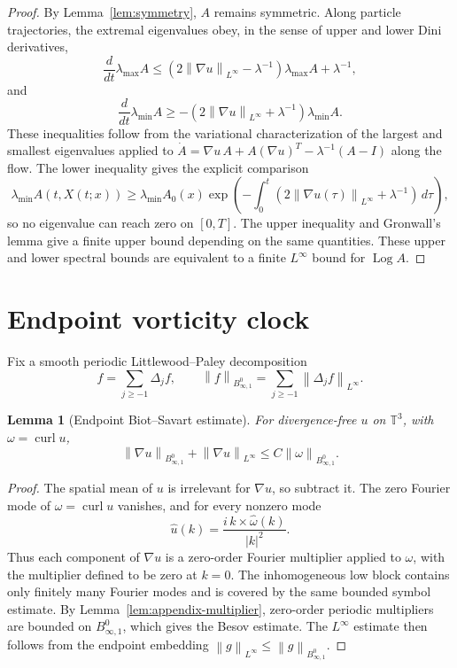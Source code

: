 \documentclass[10pt,a4paper]{amsart}
\numberwithin{equation}{section}
\newtheorem{lemma}[theorem]{Lemma}
\newcommand{\T}{\mathbb T}
\newcommand{\Id}{I}
\newcommand{\curl}{\operatorname{curl}}
\newcommand{\Log}{\operatorname{Log}}
\newcommand{\Besov}{B^0_{\infty,1}}
\newcommand{\norm}[1]{\left\lVert #1\right\rVert}
\begin{document}
\begin{proof}
By Lemma~\ref{lem:symmetry}, \(A\) remains symmetric.  Along particle
trajectories, the extremal eigenvalues obey, in the sense of upper and lower
Dini derivatives,
\[
  \frac{d}{dt}\lambda_{\max}A
  \le
  (2\norm{\nabla u}_{L^\infty}-\lambda^{-1})\lambda_{\max}A+\lambda^{-1},
\]
and
\[
  \frac{d}{dt}\lambda_{\min}A
  \ge
  -(2\norm{\nabla u}_{L^\infty}+\lambda^{-1})\lambda_{\min}A .
\]
These inequalities follow from the variational characterization of the
largest and smallest eigenvalues applied to
\(\dot A=\nabla u\,A+A(\nabla u)^T-\lambda^{-1}(A-\Id)\) along the flow.
The lower inequality gives the explicit comparison
\[
  \lambda_{\min}A(t,X(t;x))
  \ge
  \lambda_{\min}A_0(x)
  \exp\left(
  -\int_0^t(2\norm{\nabla u(\tau)}_{L^\infty}+\lambda^{-1})\,d\tau
  \right),
\]
so no eigenvalue can reach zero on \([0,T]\).  The upper inequality and
Gronwall's lemma give a finite upper bound depending on the same quantities.
These upper and lower spectral bounds are equivalent to a finite
\(L^\infty\) bound for \(\Log A\).
\end{proof}

\section{Endpoint vorticity clock}

Fix a smooth periodic Littlewood--Paley decomposition
\[
  f=\sum_{j\ge -1}\Delta_jf,\qquad
  \norm{f}_{\Besov}=\sum_{j\ge -1}\norm{\Delta_jf}_{L^\infty}.
\]

\begin{lemma}[Endpoint Biot--Savart estimate]
\label{lem:biot}
For divergence-free \(u\) on \(\T^3\), with \(\omega=\curl u\),
\begin{equation}
  \norm{\nabla u}_{\Besov}
  +
  \norm{\nabla u}_{L^\infty}
  \le C\norm{\omega}_{\Besov}.
  \label{eq:biot}
\end{equation}
\end{lemma}

\begin{proof}
The spatial mean of \(u\) is irrelevant for \(\nabla u\), so subtract it.  The
zero Fourier mode of \(\omega=\curl u\) vanishes, and for every nonzero mode
\[
  \widehat u(k)=\frac{i\,k\times\widehat\omega(k)}{|k|^2}.
\]
Thus each component of \(\nabla u\) is a zero-order Fourier multiplier applied
to \(\omega\), with the multiplier defined to be zero at \(k=0\).  The
inhomogeneous low block contains only finitely many Fourier modes and is
covered by the same bounded symbol estimate.  By
Lemma~\ref{lem:appendix-multiplier}, zero-order periodic multipliers are
bounded on \(B^0_{\infty,1}\), which gives the Besov estimate.  The
\(L^\infty\) estimate then follows from the endpoint embedding
\(\norm{g}_{L^\infty}\le\norm{g}_{B^0_{\infty,1}}\).
\end{proof}
\end{document}
